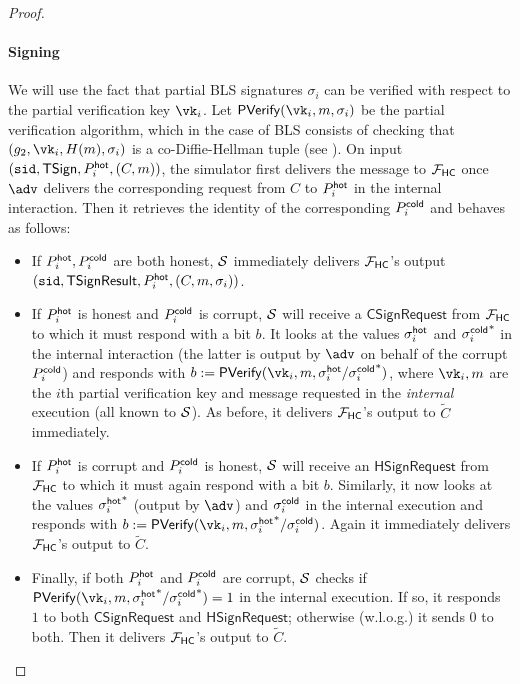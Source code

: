 \begin{proof}
\paragraph{Signing} 
We will use the fact that partial BLS signatures $\sigma_i$ can be verified with respect to the partial verification key $\vk_i$. Let $\mathsf{P}\vrfy(\vk_i, m, \sigma_i)$ be the partial verification algorithm, which in the case of BLS consists of checking that $(g_2, \vk_i, \blshash(m), \sigma_i)$ is a co-Diffie-Hellman tuple (see ).
On input $(\texttt{sid}, \mathsf{TSign}, P_i^{\mathsf{hot}}, (C, m))$, the simulator first delivers the message to $\mathcal{F}_\mathsf{HC}$ once $\adv$ delivers the corresponding request from $C$ to $P_i^{\mathsf{hot}}$ in the internal interaction. Then it retrieves the identity of the corresponding $P_i^{\mathsf{cold}}$ and behaves as follows:
\begin{itemize}
    \item If $P_i^{\mathsf{hot}}, P_i^{\mathsf{cold}}$ are both honest, $\mathcal{S}$ immediately delivers $\mathcal{F}_\mathsf{HC}$'s output $(\texttt{sid},\allowbreak \mathsf{TSignResult}, P_i^{\mathsf{hot}}, (C, m, \sigma_i))$.
    \item If $P_i^{\mathsf{hot}}$ is honest and $P_i^{\mathsf{cold}}$ is corrupt, $\mathcal{S}$ will receive a $\mathsf{CSignRequest}$ from $\mathcal{F}_\mathsf{HC}$ to which it must respond with a bit $b$. It looks at the values $\sigma_i^{\mathsf{hot}}$ and ${\sigma_i^{\mathsf{cold}}}^*$ in the internal interaction (the latter is output by $\adv$ on behalf of the corrupt $P_i^{\mathsf{cold}}$) and responds with $b := \mathsf{P}\vrfy(\vk_i, m, \sigma_i^\hot/{\sigma_i^\cold}^*)$, where $\vk_i, m$ are the $i$th partial verification key and message requested in the \emph{internal} execution (all known to $\mathcal{S}$). As before, it delivers $\mathcal{F}_\mathsf{HC}$'s output to $\tilde{C}$ immediately.
    \item If $P_i^{\mathsf{hot}}$ is corrupt and $P_i^{\mathsf{cold}}$ is honest, $\mathcal{S}$ will receive an $\mathsf{HSignRequest}$ from $\mathcal{F}_\mathsf{HC}$ to which it must again respond with a bit $b$. Similarly, it now looks at the values ${\sigma_i^{\mathsf{hot}}}^*$ (output by $\adv$) and $\sigma_i^{\mathsf{cold}}$ in the internal execution and responds with $b := \mathsf{P}\vrfy(\vk_i, m, {\sigma_i^\hot}^*/\sigma_i^\cold)$. Again it immediately delivers $\mathcal{F}_\mathsf{HC}$'s output to $\tilde{C}$.
    \item Finally, if both $P_i^{\mathsf{hot}}$ and $P_i^{\mathsf{cold}}$ are corrupt, $\mathcal{S}$ checks if $\mathsf{P}\vrfy(\vk_i, m,\allowbreak {\sigma_i^\hot}^*/{\sigma_i^\cold}^*) = 1$ in the internal execution. If so, it responds $1$ to both $\mathsf{CSignRequest}$ and $\mathsf{HSignRequest}$; otherwise (w.l.o.g.) it sends $0$ to both. Then it delivers $\mathcal{F}_\mathsf{HC}$'s output  to $\tilde{C}$.
\end{itemize}


\end{proof}
